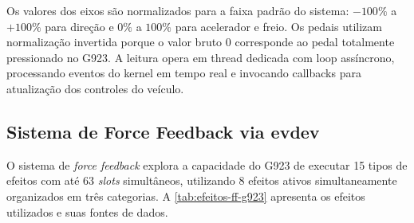 \begin{table}[!h]
\captionsetup{width=16cm}
\end{table}

Os valores dos eixos são normalizados para a faixa padrão do sistema: $-100\%$ a $+100\%$ para direção e $0\%$ a $100\%$ para acelerador e freio. Os pedais utilizam normalização invertida porque o valor bruto 0 corresponde ao pedal totalmente pressionado no G923. A leitura opera em thread dedicada com loop assíncrono, processando eventos do kernel em tempo real e invocando callbacks para atualização dos controles do veículo.

\subsection{Sistema de Force Feedback via evdev}
\label{subsec:ff-simulador}

O sistema de \textit{force feedback} explora a capacidade do G923 de executar 15 tipos de efeitos com até 63 \textit{slots} simultâneos, utilizando 8 efeitos ativos simultaneamente organizados em três categorias. A \autoref{tab:efeitos-ff-g923} apresenta os efeitos utilizados e suas fontes de dados.

